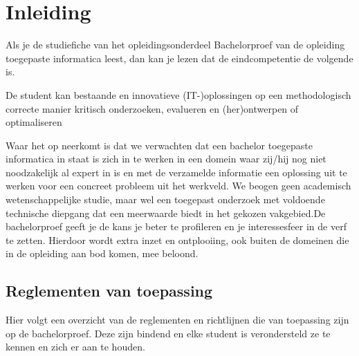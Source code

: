 \chapter{Inleiding}
\label{sec:inleiding}


%
%
%
%
%
%

Als je de studiefiche van het opleidingsonderdeel Bachelorproef van de opleiding toegepaste informatica leest, dan kan je lezen dat de eindcompetentie de volgende is.

\begin{center}
	De student kan bestaande en innovatieve (IT-)oplossingen op een methodologisch correcte manier kritisch onderzoeken, evalueren en (her)ontwerpen of optimaliseren
\end{center}

Waar het op neerkomt is dat we verwachten dat een bachelor toegepaste informatica in staat is zich in te werken in een domein waar zij/hij nog niet noodzakelijk al expert in is en met de verzamelde informatie een oplossing uit te werken voor een concreet probleem uit het werkveld. We beogen geen academisch wetenschappelijke studie, maar wel een toegepast onderzoek met voldoende technische diepgang dat een meerwaarde biedt in het gekozen vakgebied.De bachelorproef geeft je de kans je beter te profileren en je interessesfeer in de verf te zetten.  Hierdoor wordt extra inzet en ontplooiing, ook buiten de domeinen die in de opleiding aan bod komen, mee beloond.

\section{Reglementen van toepassing}
Hier volgt een overzicht van de reglementen en richtlijnen die van toepassing zijn op de bachelorproef. Deze zijn bindend en elke student is verondersteld ze te kennen en zich er aan te houden.


